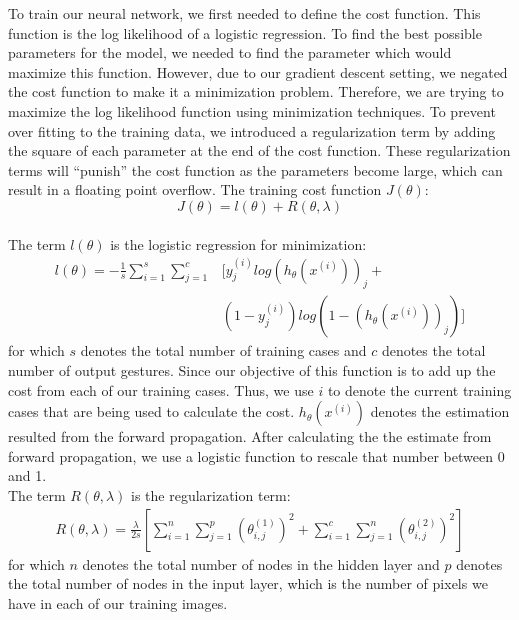 To train our neural network, we first needed to define the cost function. This
function is the log likelihood of a logistic regression. To find the best
possible parameters for the model, we needed to find the parameter which would
maximize this function. However, due to our gradient descent setting, we
negated the cost function to make it a minimization problem. Therefore, we are
trying to maximize the log likelihood function using minimization techniques.
To prevent over fitting to the training data, we introduced a regularization
term by adding the square of each parameter at the end of the cost function.
These regularization terms will ``punish'' the cost function as the parameters
become large, which can result in a floating point overflow. The training
cost function $J(\theta)$:
\begin{equation}
J(\theta) = l(\theta) + R(\theta, \lambda)
\end{equation}
\\
The term $l(\theta)$ is the logistic regression for minimization: 
\begin{equation}
\begin{split}
l(\theta) = -\frac{1}{s}\sum_{i=1}^{s} \sum_{j=1}^c 
& [y_j^{(i)}log(h_{\theta}(x^{(i)}))_j + \\
& (1-y_j^{(i)})log(1-(h_\theta(x^{(i)}))_j)]
\end{split}
\end{equation}
for which $s$ denotes the total number of training cases and $c$ denotes
the total number of output gestures. Since our objective of this function is
to add up the cost from each of our training cases. Thus, we use $i$ to
denote the current training cases that are being used to calculate the
cost. $h_{\theta}(x^{(i)})$ denotes the estimation resulted from the forward
propagation. After calculating the the estimate from forward propagation, we
use a logistic function to rescale that number between 0 and 1.
\\
The term $R(\theta, \lambda)$ is the regularization term: 
\begin{equation}
\begin{split}
R(\theta, \lambda) = \frac{\lambda}{2s}[ \sum_{i=1}^{n} \sum_{j=1}^{p} (\theta_{i,j}^{(1)})^2 + \sum_{i=1}^{c} \sum_{j=1}^{n} (\theta_{i,j}^{(2)})^2]
\end{split}
\end{equation}
for which $n$ denotes the total number of nodes in the hidden layer
and $p$ denotes the total number of nodes in the input layer, which is the
number of pixels we have in each of our training images.

